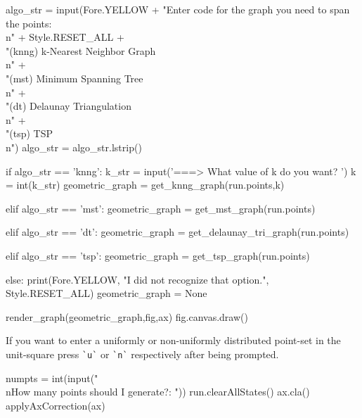 \nwenddocs{}\endmoddef\nwstartdeflinemarkup{}\nwenddeflinemarkup
algo_str = input(Fore.YELLOW + "Enter code for the graph you need to span the points:\\n" + Style.RESET_ALL  +\\
                     "(knng) k-Nearest Neighbor Graph        \\n"            +\\
                     "(mst)  Minimum Spanning Tree           \\n"            +\\
                     "(dt)   Delaunay Triangulation         \\n"             +\\
                     "(tsp)  TSP\\n")
algo_str = algo_str.lstrip()

if algo_str == 'knng':
      k_str = input('===> What value of k do you want? ')
      k     = int(k_str)
      geometric_graph = get_knng_graph(run.points,k)

elif algo_str == 'mst':
     geometric_graph = get_mst_graph(run.points)

elif algo_str == 'dt':
      geometric_graph = get_delaunay_tri_graph(run.points)

elif algo_str == 'tsp':
     geometric_graph = get_tsp_graph(run.points)

else:
      print(Fore.YELLOW, "I did not recognize that option.", Style.RESET_ALL)
      geometric_graph = None

render_graph(geometric_graph,fig,ax)
fig.canvas.draw()
\nwendcode{}\nwdocspar

If you want to enter a uniformly or non-uniformly distributed point-set in the unit-square press \verb|`u`| or \verb|`n`|
respectively after being prompted. 

\nwenddocs{}\endmoddef\nwstartdeflinemarkup{}\nwenddeflinemarkup
numpts = int(input("\\nHow many points should I generate?: ")) 
run.clearAllStates()
ax.cla()
applyAxCorrection(ax)

